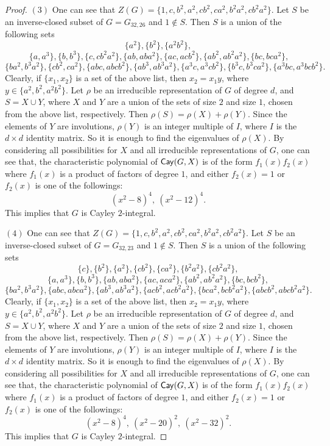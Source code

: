 \documentclass[10pt,a4paper]{amsart}
\def\Cay{{\sf Cay}} \def\Ker{{\sf Ker}}
\begin{document}
\begin{proof}
	$(3)$ One can see that $Z(G)=\{1,c,b^2,a^2,cb^2,ca^2,b^2a^2,cb^2a^2\}$.
	Let $S$ be an inverse-closed subset of $G=G_{32,26}$ and $1\notin S$. Then
	$S$ is a union of the following sets
	\[\{a^2\},\{b^2\},\{a^2b^2\},\]
	\[\  \{a, a^3\}, \{b, b^3\} ,\{ c, cb^2a^2 \},\{ ab, aba^2 \},\{ ac, acb^2 \},
	\{ ab^2, ab^2a^2 \},\{ bc, bca^2 \},\]
	\[\{ ba^2, b^3a^2 \},\{ cb^2, ca^2 \},\{ abc, abcb^2 \},
	\{ ab^3, ab^3a^2 \},\{ a^3c, a^3cb^2 \},\{ b^3c, b^3ca^2 \},\{ a^3bc, a^3bcb^2\}.
	\]
	Clearly, if $\{x_1,x_2\}$ is a set of the above list, then $x_2=x_1y$, where $y\in\{a^2,b^2,a^2b^2\}$. Let $\rho$ be an irreducible representation of $G$ of degree $d$, and $S=X\cup Y$, where $X$ and $Y$ are a union of the sets of size $2$ and size $1$, chosen from the above list,  respectively. Then $\rho(S)=\rho(X)+\rho(Y)$. Since the elements of $Y$ are involutions, $\rho(Y)$ is an integer multiple of $I$, where $I$ is the $d\times d$ identity matrix. So it is enough to find the eigenvalues of $\rho(X)$. By considering all possibilities for $X$ and all irreducible representations of $G$, one can see that, the characteristic polynomial of $\Cay(G,X)$ is of the form $f_1(x)f_2(x)$ where $f_1(x)$ is a product of factors of degree $1$, and either $f_2(x)=1$ or $f_2(x)$ is one of the followings:
	\[(x^2-8)^4,~(x^2-12)^4.\]
	This implies that $G$ is Cayley $2$-integral.
	
	$(4)$
	One can see that $Z(G)=\{1,c,b^2,a^2,cb^2,ca^2,b^2a^2,cb^2a^2\}$.
	Let $S$ be an inverse-closed subset of $G=G_{32,23}$ and $1\notin S$. Then
	$S$ is a union of the following sets
	\[\{c\}, \{b^2\}, \{a^2\}, \{cb^2\}, \{ca^2\}, \{b^2a^2\}, \{cb^2a^2\},\]
	\[ \{ a, a^3 \}, \{ b, b^3 \}, \{ ab, aba^2 \}, \{ ac, aca^2 \}, \{ ab^2, ab^2a^2 \}, \{ bc, bcb^2 \},\]
	\[\{ ba^2, b^3a^2 \}, \{ abc, abca^2 \}, \{ ab^3, ab^3a^2 \},
	\{ acb^2, acb^2a^2 \}, \{ bca^2, bcb^2a^2 \}, \{ abcb^2, abcb^2a^2 \}.
	\]
	Clearly, if $\{x_1,x_2\}$ is a set of the above list, then $x_2=x_1y$, where $y\in\{a^2,b^2,a^2b^2\}$. Let $\rho$ be an irreducible representation of $G$ of degree $d$, and $S=X\cup Y$, where $X$ and $Y$ are a union of the sets of size $2$ and size $1$, chosen from the above list,  respectively. Then $\rho(S)=\rho(X)+\rho(Y)$. Since the elements of $Y$ are involutions, $\rho(Y)$ is an integer multiple of $I$, where $I$ is the $d\times d$ identity matrix. So it is enough to find the eigenvalues of $\rho(X)$. By considering all possibilities for $X$ and all irreducible representations of $G$, one can see that, the characteristic polynomial of $\Cay(G,X)$ is of the form $f_1(x)f_2(x)$ where $f_1(x)$ is a product of factors of degree $1$, and either $f_2(x)=1$ or $f_2(x)$ is one of the followings:
	\[(x^2-8)^4,~(x^2-20)^2,~(x^2-32)^2.\]
	This implies that $G$ is Cayley $2$-integral.
\end{proof}
\end{document}
